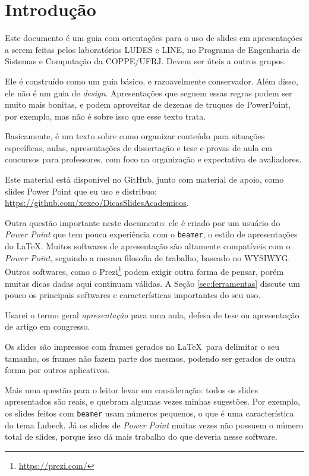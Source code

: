 \section{Introdução}

Este documento é um guia com orientações para o uso de slides em apresentações a serem feitas pelos laboratórios LUDES e LINE, no Programa de Engenharia de Sistemas e Computação da COPPE/UFRJ. Devem ser úteis a outros grupos.

Ele é construído como um guia básico, e razoavelmente conservador.
Além disso, ele não é um guia de \textit{design}.
Apresentações que seguem essas regras podem ser muito mais bonitas, e podem aproveitar de dezenas de truques de PowerPoint, por exemplo, mas não é sobre isso que esse texto trata.

Basicamente, é um texto sobre como organizar conteúdo para situações específicas, aulas, apresentações de dissertação e tese e provas de aula em concursos para professores, com foco na organização e expectativa de avaliadores.

Este material está disponível no GitHub, junto com material de apoio, como slides Power Point que eu uso e distribuo: \url{https://github.com/xexeo/DicasSlidesAcademicos}.

Outra questão importante neste documento: ele é criado por um usuário do \textit{Power Point} que tem pouca experiência com o \texttt{beamer}, o estilo de apresentações do \LaTeX.
Muitos softwares de apresentação são altamente compatíveis com o \textit{Power Point}, seguindo a mesma filosofia de trabalho, baseado no WYSIWYG.
Outros softwares, como o Prezi\footnote{\url{https://prezi.com/}} podem exigir outra forma de pensar, porém muitas dicas dadas aqui continuam válidas. A Seção \ref{sec:ferramentas} discute um pouco os principais softwares e características importantes do seu uso.

Usarei o termo geral \textit{apresentação} para uma aula, defesa de tese ou apresentação de artigo em congresso.

Os slides são impressos com frames gerados no \LaTeX\ para delimitar o seu tamanho, os frames não fazem parte dos mesmos, podendo ser gerados de outra forma por outros aplicativos.

Mais uma questão para o leitor levar em consideração: todos os slides apresentados são reais, e quebram algumas vezes minhas sugestões.
Por exemplo, os slides feitos com \texttt{beamer} usam números pequenos, o que é uma característica do tema Lubeck.
Já os slides de \textit{Power Point} muitas vezes não possuem o número total de slides, porque isso dá mais trabalho do que deveria nesse software.

